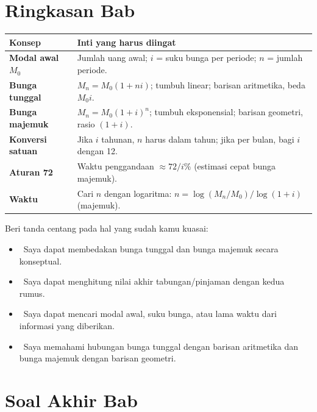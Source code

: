 \documentclass[11pt,a4paper]{report}
\theoremstyle{gaya}
\newcommand{\cek}{\ding{113}\ } %
\begin{document}
\section*{Ringkasan Bab}
\begin{center}
\begin{tabular}{>{\bfseries}p{3.5cm} p{10.2cm}}
\toprule
Konsep & Inti yang harus diingat \\
\midrule
Modal awal $M_0$ & Jumlah uang awal; $i$ = suku bunga per periode; $n$ = jumlah periode. \\
Bunga tunggal & $M_n = M_0(1+ni)$; tumbuh linear; barisan aritmetika, beda $M_0i$. \\
Bunga majemuk & $M_n = M_0(1+i)^n$; tumbuh eksponensial; barisan geometri, rasio $(1+i)$. \\
Konversi satuan & Jika $i$ tahunan, $n$ harus dalam tahun; jika per bulan, bagi $i$ dengan 12. \\
Aturan 72 & Waktu penggandaan $\approx 72/i\%$ (estimasi cepat bunga majemuk). \\
Waktu & Cari $n$ dengan logaritma: $n = \log(M_n/M_0)/\log(1+i)$ (majemuk). \\
\bottomrule
\end{tabular}
\end{center}

\begin{refleksi}
Beri tanda centang pada hal yang sudah kamu kuasai:
\begin{itemize}[leftmargin=*,label={},topsep=2pt]
  \item \cek Saya dapat membedakan bunga tunggal dan bunga majemuk secara konseptual.
  \item \cek Saya dapat menghitung nilai akhir tabungan/pinjaman dengan kedua rumus.
  \item \cek Saya dapat mencari modal awal, suku bunga, atau lama waktu dari informasi yang diberikan.
  \item \cek Saya memahami hubungan bunga tunggal dengan barisan aritmetika dan bunga majemuk dengan barisan geometri.
\end{itemize}
\end{refleksi}

\section*{Soal Akhir Bab \thechapter}
\end{document}
